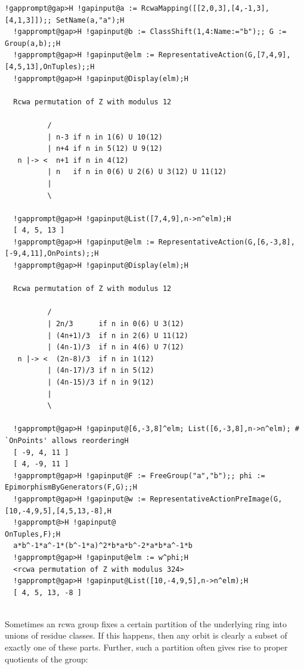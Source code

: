 \documentclass[a4paper,11pt]{report}
\begin{document}
{{{\begin{Verbatim}[commandchars=!@H,fontsize=\small,frame=single,label=Example]
  !gapprompt@gap>H !gapinput@a := RcwaMapping([[2,0,3],[4,-1,3],[4,1,3]]);; SetName(a,"a");H
  !gapprompt@gap>H !gapinput@b := ClassShift(1,4:Name:="b");; G := Group(a,b);;H
  !gapprompt@gap>H !gapinput@elm := RepresentativeAction(G,[7,4,9],[4,5,13],OnTuples);;H
  !gapprompt@gap>H !gapinput@Display(elm);H
  
  Rcwa permutation of Z with modulus 12
  
          /
          | n-3 if n in 1(6) U 10(12)
          | n+4 if n in 5(12) U 9(12)
   n |-> <  n+1 if n in 4(12)
          | n   if n in 0(6) U 2(6) U 3(12) U 11(12)
          |
          \
  
  !gapprompt@gap>H !gapinput@List([7,4,9],n->n^elm);H
  [ 4, 5, 13 ]
  !gapprompt@gap>H !gapinput@elm := RepresentativeAction(G,[6,-3,8],[-9,4,11],OnPoints);;H
  !gapprompt@gap>H !gapinput@Display(elm);H
  
  Rcwa permutation of Z with modulus 12
  
          /
          | 2n/3      if n in 0(6) U 3(12)
          | (4n+1)/3  if n in 2(6) U 11(12)
          | (4n-1)/3  if n in 4(6) U 7(12)
   n |-> <  (2n-8)/3  if n in 1(12)
          | (4n-17)/3 if n in 5(12)
          | (4n-15)/3 if n in 9(12)
          |
          \
  
  !gapprompt@gap>H !gapinput@[6,-3,8]^elm; List([6,-3,8],n->n^elm); # `OnPoints' allows reorderingH
  [ -9, 4, 11 ]
  [ 4, -9, 11 ]
  !gapprompt@gap>H !gapinput@F := FreeGroup("a","b");; phi := EpimorphismByGenerators(F,G);;H
  !gapprompt@gap>H !gapinput@w := RepresentativeActionPreImage(G,[10,-4,9,5],[4,5,13,-8],H
  !gapprompt@>H !gapinput@                                     OnTuples,F);H
  a*b^-1*a^-1*(b^-1*a)^2*b*a*b^-2*a*b*a^-1*b
  !gapprompt@gap>H !gapinput@elm := w^phi;H
  <rcwa permutation of Z with modulus 324>
  !gapprompt@gap>H !gapinput@List([10,-4,9,5],n->n^elm);H
  [ 4, 5, 13, -8 ]
  
\end{Verbatim}
 }

 Sometimes an rcwa group fixes a certain partition of the underlying ring into
unions of residue classes. If this happens, then any orbit is clearly a subset
of exactly one of these parts. Further, such a partition often gives rise to
proper quotients of the group: 

}}
\end{document}
